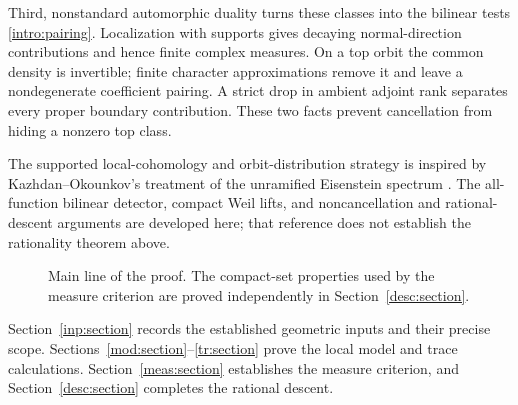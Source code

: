 Third, nonstandard automorphic duality turns these classes into the
bilinear tests \eqref{intro:pairing}. Localization with supports gives
decaying normal-direction contributions and hence finite complex
measures. On a top orbit the common density is invertible; finite
character approximations remove it and leave a nondegenerate coefficient
pairing. A strict drop in ambient adjoint rank separates every proper
boundary contribution. These two facts prevent cancellation from hiding
a nonzero top class.

The supported local-cohomology and orbit-distribution strategy is inspired
by Kazhdan--Okounkov's treatment of the unramified Eisenstein spectrum
\cite[Sections~2.6.1--2.6.4 and~3.3--3.4]{KazhdanOkounkov}.
The all-function bilinear detector, compact Weil lifts, and
noncancellation and rational-descent arguments are developed here;
that reference does not establish the rationality theorem above.

\begin{figure}[ht]
\centering
{}
\caption{Main line of the proof. The compact-set properties used by
the measure criterion are proved independently in
Section~\ref{desc:section}.}
\label{intro:diagram}
\end{figure}

Section~\ref{inp:section} records the established geometric inputs and
their precise scope. Sections~\ref{mod:section}--\ref{tr:section} prove the
local model and trace calculations. Section~\ref{meas:section} establishes
the measure criterion, and Section~\ref{desc:section} completes the
rational descent.
